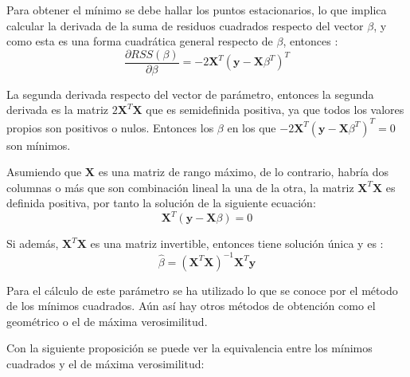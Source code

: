 \noindent Para obtener el mínimo se debe hallar los puntos estacionarios, lo que implica calcular la derivada de la suma de residuos cuadrados respecto del vector $\beta$, y como esta es una forma cuadrática general respecto de $\beta$, entonces \cite{Morrison 1976}:
\begin{equation}
\dfrac{\partial RSS(\beta)}{\partial \beta}= -2\mathbf{X}^T(\mathbf{y}-\mathbf{X}\beta^T)^T
\end{equation}

\noindent La segunda derivada respecto del vector de parámetro, entonces la segunda derivada es la matriz $2\mathbf{X}^T\mathbf{X}$ que es semidefinida positiva, ya que todos los valores propios son positivos o nulos. Entonces los $\beta$ en los que $-2\mathbf{X}^T(\mathbf{y}-\mathbf{X}\beta^T)^T=0$ son mínimos.  

\noindent Asumiendo que $\textbf{X}$ es una matriz de rango máximo, de lo contrario, habría dos columnas o más que son combinación lineal la una de la otra, la matriz $\textbf{X}^T\textbf{X}$ es definida positiva, por tanto la solución de la siguiente ecuación:
\begin{equation}
\textbf{X}^T(\textbf{y}-\textbf{X}\beta)=0
\end{equation}

\noindent Si además, $\textbf{X}^T\textbf{X}$ es una matriz invertible, entonces tiene solución única y es :
\begin{equation}
\hat{\beta}=(\textbf{X}^T\textbf{X})^{-1}\textbf{X}^T\textbf{y}
\end{equation}

\noindent Para el cálculo de este parámetro se ha utilizado lo que se conoce por el método de los mínimos cuadrados. Aún así hay otros métodos de obtención como el geométrico o el de máxima verosimilitud. 

\noindent Con la siguiente proposición se puede ver la equivalencia entre los mínimos cuadrados y el de máxima verosimilitud:

